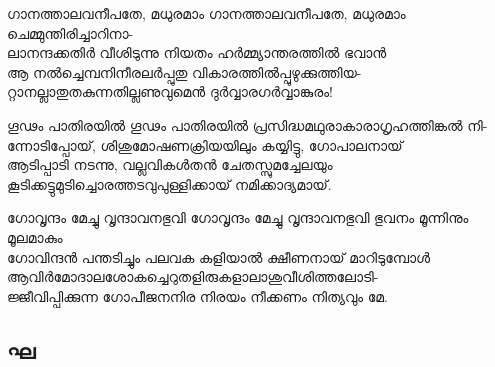 \begin{enumerate}


\begin{slokam}{\VSv}{\CKP}{ഗാനത്താലവനീപതേ, മധുരമാം}
ഗാനത്താലവനീപതേ, മധുരമാം ചെമ്മുന്തിരിച്ചാറിനാ-\\
ലാനന്ദക്കതിര്‍ വീശിടുന്നു നിയതം ഹര്‍മ്മ്യാന്തരത്തില്‍ ഭവാന്‍\\
ആ നല്‍ച്ചെമ്പനിനീരലര്‍പ്പുതു വികാരത്തില്‍പ്പുഴുക്കുത്തിയ-\\
റ്റാനല്ലാതുതകുന്നതില്ലണുവുമെന്‍ ദുര്‍വ്വാരഗര്‍വ്വാങ്കുരം!
\end{slokam}




\begin{slokam}{\VSv}{\VKG}{ഗൂഢം പാതിരയിൽ}
ഗൂഢം പാതിരയിൽ പ്രസിദ്ധമഥുരാകാരാഗൃഹത്തിങ്കൽ നി-\\
ന്നോടിപ്പോയ്‌, ശിശുമോഷണക്രിയയിലും കയ്യിട്ടു, ഗോപാലനായ്‌\\
ആടിപ്പാടി നടന്നു, വല്ലവികള്‍തൻ ചേതസ്സുമച്ചേലയും\\
കൂടിക്കട്ടുമുടിച്ചൊരത്തടവുപുള്ളിക്കായ്‌ നമിക്കാദ്യമായ്‌.
\end{slokam}


\begin{slokam}{\VSr}{\Unk}{ഗോവൃന്ദം മേച്ചു വൃന്ദാവനഭുവി}
ഗോവൃന്ദം മേച്ചു വൃന്ദാവനഭുവി ഭുവനം മൂന്നിനും മൂലമാകും\\
ഗോവിന്ദൻ പന്തടിച്ചും പലവക കളിയാൽ ക്ഷീണനായ്‌ മാറിടുമ്പോള്‍\\
ആവിർമോദാലശോകച്ചെറുതളിരുകളാലാശുവീശിത്തലോടി-\\
ജ്ജീവിപ്പിക്കുന്ന ഗോപീജനനിര നിരയം നീക്കണം നിത്യവും മേ.
\end{slokam}

\end{enumerate}
\subsection{ഘ}

